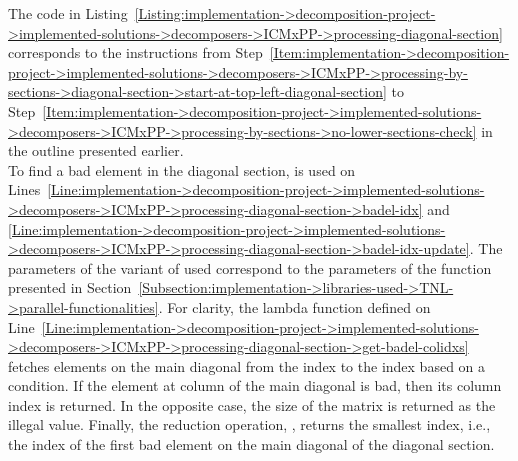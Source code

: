 The code in Listing~\ref{Listing:implementation->decomposition-project->implemented-solutions->decomposers->ICMxPP->processing-diagonal-section} corresponds to the instructions from Step~\ref{Item:implementation->decomposition-project->implemented-solutions->decomposers->ICMxPP->processing-by-sections->diagonal-section->start-at-top-left-diagonal-section} to Step~\ref{Item:implementation->decomposition-project->implemented-solutions->decomposers->ICMxPP->processing-by-sections->no-lower-sections-check} in the outline presented earlier.\\
To find a bad element in the diagonal section,  is used on Lines~\ref{Line:implementation->decomposition-project->implemented-solutions->decomposers->ICMxPP->processing-diagonal-section->badel-idx} and \ref{Line:implementation->decomposition-project->implemented-solutions->decomposers->ICMxPP->processing-diagonal-section->badel-idx-update}.
The parameters of the variant of  used correspond to the parameters of the  function presented in Section~\ref{Subsection:implementation->libraries-used->TNL->parallel-functionalities}.
For clarity, the lambda function defined on Line~\ref{Line:implementation->decomposition-project->implemented-solutions->decomposers->ICMxPP->processing-diagonal-section->get-badel-colidxs} fetches elements on the main diagonal from the  index to the  index based on a condition.
If the element at column  of the main diagonal is bad, then its column index is returned.
In the opposite case, the size of the matrix is returned as the illegal value.
Finally, the reduction operation, , returns the smallest index, i.e., the index of the first bad element on the main diagonal of the diagonal section.

